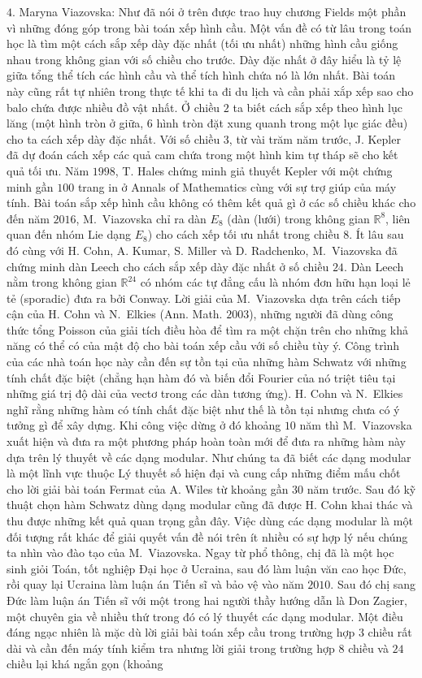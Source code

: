 \begin{multicols}{2}
	\vskip 0.05cm
	$4.$ Maryna Viazovska: Như đã nói ở trên được trao huy chương Fields một phần vì những đóng góp trong bài toán xếp hình cầu.
	\vskip 0.05cm
	Một vấn đề có từ lâu trong toán học là tìm một cách sắp xếp dày đặc nhất (tối ưu nhất) những hình cầu giống nhau trong không gian với số chiều cho trước. Dày đặc nhất ở đây hiểu là tỷ lệ giữa tổng thể tích các hình cầu và thể tích hình chứa nó là lớn nhất. Bài toán này cũng rất tự nhiên trong thực tế khi ta đi du lịch và cần phải xắp xếp sao cho balo chứa được nhiều đồ vật nhất. Ở chiều $2$ ta biết cách sắp xếp theo hình lục lăng (một hình tròn ở giữa, $6$ hình tròn đặt xung quanh trong một lục giác đều) cho ta cách xếp dày đặc nhất. Với số chiều $3$, từ vài trăm năm trước, J. Kepler đã dự đoán cách xếp các quả cam chứa trong một hình kim tự tháp sẽ cho kết quả tối ưu. Năm $1998$, T. Hales chứng minh giả thuyết Kepler với một chứng minh gần $100$ trang in ở Annals of Mathematics cùng với sự trợ giúp của máy tính. Bài toán sắp xếp hình cầu không có thêm kết quả gì ở các số chiều khác cho đến năm $2016$, M.~Viazovska chỉ ra dàn $E_{8}$ (dàn (lưới) trong không gian $\mathbb{R}^8$, liên quan đến nhóm Lie dạng $E_{8}$) cho cách xếp tối ưu nhất trong chiều $8$. Ít lâu sau đó cùng với H. Cohn, A. Kumar, S. Miller và D. Radchenko, M.~Viazovska đã chứng minh dàn Leech cho cách sắp xếp dày đặc nhất ở số chiều $24$. Dàn Leech nằm trong không gian $\mathbb{R}^{24}$ có nhóm các tự đẳng cấu là nhóm đơn hữu hạn loại lẻ tẻ (sporadic) đưa ra bởi Conway. Lời giải của M.~Viazovska dựa trên cách tiếp cận của H. Cohn và N.~Elkies (Ann. Math. $2003$), những người đã dùng công thức tổng Poisson của giải tích điều hòa để tìm ra một chặn trên cho những khả năng có thể có của mật độ cho bài toán xếp cầu với số chiều tùy ý. Công trình của các nhà toán học này cần đến sự tồn tại của những hàm Schwatz với những tính chất đặc biệt (chẳng hạn hàm đó và biến đổi Fourier của nó triệt tiêu tại những giá trị độ dài của vectơ trong các dàn tương ứng). H. Cohn và N.~Elkies nghĩ rằng những hàm có tính chất đặc biệt như thế là tồn tại nhưng chưa có ý tưởng gì để xây dựng. Khi công việc dừng ở đó khoảng $10$ năm thì M.~Viazovska xuất hiện và đưa ra một phương pháp hoàn toàn mới để đưa ra những hàm này dựa trên lý thuyết về các dạng modular. Như chúng ta đã biết các dạng modular là một lĩnh vực thuộc Lý thuyết số hiện đại và cung cấp những điểm mấu chốt cho lời giải bài toán Fermat của A. Wiles từ khoảng gần $30$ năm trước. Sau đó kỹ thuật chọn hàm Schwatz dùng dạng modular cũng đã được H. Cohn khai thác và thu được những kết quả quan trọng gần đây. Việc dùng các dạng modular là một đối tượng rất khác để giải quyết vấn đề nói trên ít nhiều có sự hợp lý nếu chúng ta nhìn vào đào tạo của M.~Viazovska. Ngay từ phổ thông, chị đã là một học sinh giỏi Toán, tốt nghiệp Đại học ở Ucraina, sau đó làm luận văn cao học Đức, rồi quay lại Ucraina làm luận án Tiến sĩ và bảo vệ vào năm $2010$. Sau đó chị sang Đức làm luận án Tiến sĩ với một trong hai người thầy hướng dẫn là Don Zagier, một chuyên gia về nhiều thứ trong đó có lý thuyết các dạng modular. Một điều đáng ngạc nhiên là mặc dù lời giải bài toán xếp cầu trong trường hợp $3$ chiều rất dài và cần đến máy tính kiểm tra nhưng lời giải trong trường hợp $8$ chiều và $24$ chiều lại khá ngắn gọn (khoảng 
\end{multicols}

